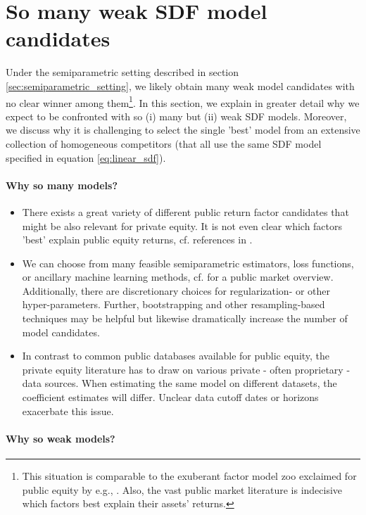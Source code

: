 \documentclass[12pt]{article}
\begin{document}
\section{So many weak SDF model candidates}
\label{sec:model_selection}

Under the semiparametric setting described in section \ref{sec:semiparametric_setting}, we likely obtain many weak model candidates with no clear winner among them\footnote{This situation is comparable to the exuberant factor model zoo exclaimed for public equity by e.g., \cite{C11,FGX20}. Also, the vast public market literature is indecisive which factors best explain their assets' returns.}.
In this section, we explain in greater detail why we expect to be confronted with so (i) many but (ii) weak SDF models.
Moreover, we discuss why it is challenging to select the single 'best' model from an extensive collection of homogeneous competitors (that all use the same SDF model specified in equation \ref{eq:linear_sdf}).

\paragraph{Why so many models?}

\begin{itemize}
	\item There exists a great variety of different public return factor candidates that might be also relevant for private equity. It is not even clear which factors 'best' explain public equity returns, cf. references in \cite{KN20}. 
	\item We can choose from many feasible semiparametric estimators, loss functions, or ancillary machine learning methods, cf. \cite{GKX20} for a public market overview.
	Additionally, there are discretionary choices for regularization- or other hyper-parameters.
	Further, bootstrapping and other resampling-based techniques may be helpful but likewise dramatically increase the number of model candidates.
	\item In contrast to common public databases available for public equity, the private equity literature has to draw on various private - often proprietary - data sources. When estimating the same model on different datasets, the coefficient estimates will differ. Unclear data cutoff dates or horizons exacerbate this issue.
\end{itemize}

\paragraph{Why so weak models?}
\end{document}
